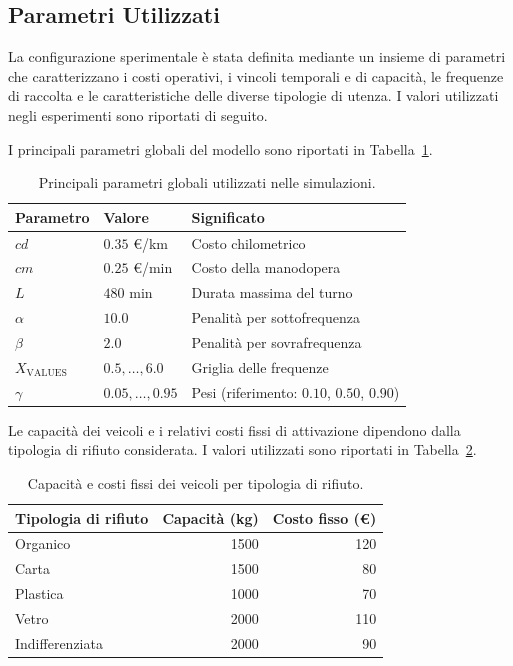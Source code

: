 \subsection{Parametri Utilizzati}



La configurazione sperimentale è stata definita mediante un insieme di parametri che caratterizzano i costi operativi, i vincoli temporali e di capacità, le frequenze di raccolta e le caratteristiche delle diverse tipologie di utenza. I valori utilizzati negli esperimenti sono riportati di seguito.

I principali parametri globali del modello sono riportati in Tabella~\ref{tab:parametri_globali}.

\newpage
\begin{table}[htbp]
	\centering
	\caption{Principali parametri globali utilizzati nelle simulazioni.}
	\label{tab:parametri_globali}
	\begin{tabular}{lll}
		\hline
		Parametro & Valore & Significato \\
		\hline
		$cd$ & $0.35$ \euro/km & Costo chilometrico \\
		$cm$ & $0.25$ \euro/min & Costo della manodopera \\
		$L$ & $480$ min & Durata massima del turno \\
		$\alpha$ & $10.0$ & Penalità per sottofrequenza \\
		$\beta$ & $2.0$ & Penalità per sovrafrequenza \\
		$X_{\mathrm{VALUES}}$ & $0.5,\ldots,6.0$ & Griglia delle frequenze \\
		$\gamma$ & $0.05,\ldots,0.95$ & Pesi (riferimento: $0.10$, $0.50$, $0.90$) \\
		\hline
	\end{tabular}
\end{table}

Le capacità dei veicoli e i relativi costi fissi di attivazione dipendono dalla tipologia di rifiuto considerata. I valori utilizzati sono riportati in Tabella~\ref{tab:veicoli_rifiuti}.

\begin{table}[htbp]
	\centering
	\caption{Capacità e costi fissi dei veicoli per tipologia di rifiuto.}
	\label{tab:veicoli_rifiuti}
	\begin{tabular}{lrr}
		\hline
		Tipologia di rifiuto & Capacità (kg) & Costo fisso (\euro) \\
		\hline
		Organico & 1500 & 120 \\
		Carta & 1500 & 80 \\
		Plastica & 1000 & 70 \\
		Vetro & 2000 & 110 \\
		Indifferenziata & 2000 & 90 \\
		\hline
	\end{tabular}
\end{table}


